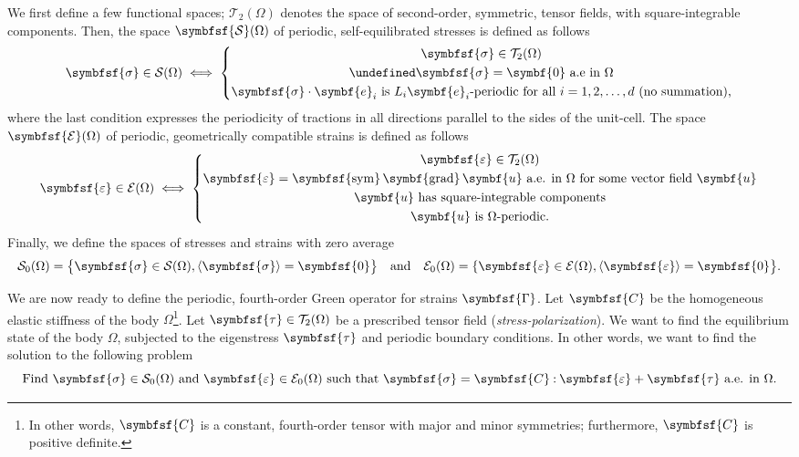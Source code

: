 \documentclass[draft, appendixprefix=true, chapterprefix=true, fontsize=12pt, numbers=noendperiod]{scrbook}
\newcommand{\dbldot}{\mathbin{\mathord{:}}}
\let\div\undefined
\DeclareMathOperator{\div}{div}
\DeclareMathOperator{\grad}{\symbf{grad}}
\DeclareMathOperator{\sym}{\symbfsf{sym}}
\newcommand{\tens}[1]{\symbfsf{#1}}
\renewcommand{\vec}[1]{\symbf{#1}}
\newcommand{\tensors}{\mathcal T}
\newcommand{\stresses}{\mathcal S}
\newcommand{\strains}{\mathcal E}
\begin{document}
We first define a few functional spaces; \(\tensors_2(\Omega)\) denotes the
space of second-order, symmetric, tensor fields, with square-integrable
components. Then, the space \(\tens\stresses(\Omega)\) of periodic,
self-equilibrated stresses is defined as follows
\begin{equation}
  \label{eq:7}
  \tens\sigma\in\stresses(\Omega)\iff\left\{
  \begin{gathered}
    \tens\sigma\in\tensors_2(\Omega)\\
    \div\tens\sigma=\vec 0\text{ a.e in }\Omega\\
    \tens\sigma\cdot\vec e_i\text{ is }L_i\vec e_i\text{-periodic for all }i=1, 2, \ldots, d\text{ (no summation),}
  \end{gathered}
  \right.
\end{equation}
where the last condition expresses the periodicity of tractions in all
directions parallel to the sides of the unit-cell. The space
\(\tens\strains(\Omega)\) of periodic, geometrically compatible strains is
defined as follows
\begin{equation}
  \label{eq:8}
  \tens\varepsilon\in\strains(\Omega)\iff\left\{
  \begin{gathered}
    \tens\varepsilon\in\tensors_2(\Omega)\\
    \tens\varepsilon=\sym\grad\vec u\text{ a.e. in }\Omega\text{ for some vector
      field }\vec u\\
    \vec u\text{ has square-integrable components}\\
    \vec u\text{ is }\Omega\text{-periodic.}
  \end{gathered}
  \right.
\end{equation}
Finally, we define the spaces of stresses and strains with zero average
\begin{equation}
  \label{eq:9}
  \stresses_0(\Omega)=\bigl\{\tens\sigma\in\stresses(\Omega),
  \langle\tens\sigma\rangle=\tens0\bigr\}
  \quad\text{and}\quad
  \strains_0(\Omega)=\{\tens\varepsilon\in\strains(\Omega),
  \langle\tens\varepsilon\rangle=\tens0\bigr\}.
\end{equation}


We are now ready to define the periodic, fourth-order Green operator for
strains \(\tens\Gamma\). Let \(\tens C\) be the homogeneous elastic stiffness
of the body \(\Omega\)\footnote{In other words, \(\tens C\) is a constant,
  fourth-order tensor with major and minor symmetries; furthermore, \(\tens C\)
  is positive definite.}. Let \(\tens\tau\in\tensors_2(\Omega)\) be a
prescribed tensor field (\emph{stress-polarization}). We want to find the
equilibrium state of the body \(\Omega\), subjected to the eigenstress
\(\tens\tau\) and periodic boundary conditions. In other words, we want to find
the solution to the following problem
\begin{equation}
  \label{eq:6}
  \text{Find }\tens\sigma\in\stresses_0(\Omega)
  \text{ and }\tens\varepsilon\in\strains_0(\Omega)
  \text{ such that }\tens\sigma=\tens C\dbldot\tens\varepsilon+\tens\tau
  \text{ a.e. in }\Omega.
\end{equation}
\end{document}
